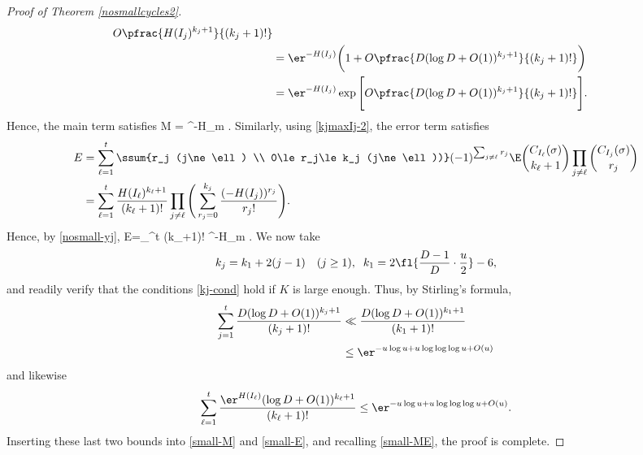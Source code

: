 \begin{proof}[Proof of Theorem \ref{nosmallcycles2}]
\begin{align}
 O\pfrac{H(I_j)^{k_j+1}}{(k_j+1)!} \notag \\
&=\er^{-H(I_j)} \bigg( 1 + O \pfrac{D(\log D+O(1))^{k_j+1}}{(k_j+1)!}  \bigg) \notag
\\ &=\er^{-H(I_j)} \exp \Bigg[ O \pfrac{D(\log D+O(1))^{k_j+1}}{(k_j+1)!}  \Bigg].
\label{nosmall-yj}
\end{align}
Hence, the main term satisfies
\be\label{small-M}
M = \er^{-H_m} \exp\left[ O\(\sum_{j=1}^t \frac{D(\log D+O(1))^{k_j+1}}{(k_j+1)!}\) \right].
\ee
Similarly, using \eqref{kjmaxIj-2},  the error term satisfies
\begin{align*}
E &=  \sum_{\ell=1}^t \ssum{r_j (j\ne \ell) \\ 0\le r_j\le k_j (j\ne \ell))} 
(-1)^{\sum_{j\ne \ell} r_j} \E \binom{C_{I_\ell}(\sigma)}{k_\ell+1} 
\prod_{j\ne \ell} \binom{C_{I_j}(\sigma)}{r_j} \\
&=  \sum_{\ell=1}^t
 \frac{H(I_\ell)^{k_\ell+1}}{(k_\ell+1)!} \prod_{j\ne \ell}
\Bigg( \sum_{r_j=0}^{k_j} \frac{(-H(I_j))^{r_j}}{r_j!}  \Bigg) .
\end{align*}
Hence, by \eqref{nosmall-yj},
\be\label{small-E}
E=\sum_{}^t 
{(k_\ell+1)!} \er^{-H_m} \exp\left[ O\(\sum_{j=1}^t \frac{D(\log D+O(1))^{k_j+1}}{(k_j+1)!}\) \right].
\ee
We now take
\[
k_j=k_1+2(j-1) \quad (j\ge 1), \;\; k_1=2\fl{\frac{D-1}{D} \cdot \frac{u}{2}}-6,
\]
and readily verify that the conditions \eqref{kj-cond} hold if
$K$ is large enough.
Thus, by Stirling's formula,
\begin{align*}
\sum_{j=1}^t \frac{D(\log D+O(1))^{k_j+1}}{(k_j+1)!} 
&\ll \frac{D(\log D+O(1))^{k_1+1}}{(k_1+1)!} \\
&\le \er^{-u\log u + u\log\log\log u + O(u)}
\end{align*}
and likewise
\[
\sum_{\ell=1}^t \frac{\er^{H(I_\ell)}(\log D+O(1))^{k_\ell+1}}
{(k_\ell+1)!} \le  \er^{-u\log u + u\log\log\log u + O(u)}.
\]
Inserting these last two bounds into 
\eqref{small-M} and \eqref{small-E}, and recalling \eqref{small-ME},
the proof is complete.
\end{proof}
